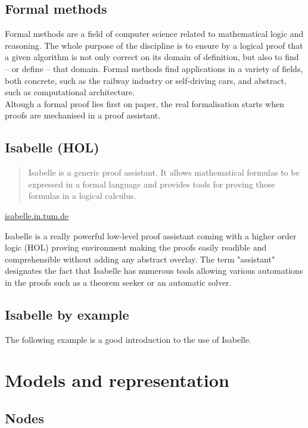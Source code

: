 \documentclass[a4 paper, 12pt]{article}
\begin{document}
\subsection{Formal methods}
Formal methods are a field of computer science related to mathematical logic and reasoning. The whole purpose of the discipline is to ensure by a logical proof that a given algorithm is not only correct on its domain of definition, but also to find -- or define -- that domain. Formal methods find applications in a variety of fields, both concrete, such as the railway industry or self-driving cars, and abstract, such as computational architecture.\\
Altough a formal proof lies first on paper, the real formalisation starts when proofs are mechanised in a proof assistant.

\subsection{Isabelle (HOL)}
\begin{quote}
    Isabelle is a generic proof assistant. It allows mathematical formulas to be expressed in a formal language and provides tools for proving those formulas in a logical calculus.
\end{quote}
\begin{flushright}
    \href{https://isabelle.in.tum.de/}{isabelle.in.tum.de}
\end{flushright}
Isabelle is a really powerful low-level proof assistant coming with a higher order logic (HOL) proving environment making the proofs easily readible and comprehensible without adding any abstract overlay. The term "assistant" designates the fact that Isabelle has numerous tools allowing various automations in the proofs such as a theorem seeker or an automatic solver.

\subsection{Isabelle by example}
The following example is a good introduction to the use of Isabelle.

\pagebreak

\section{Models and representation}
\subsection{Nodes}
\end{document}
